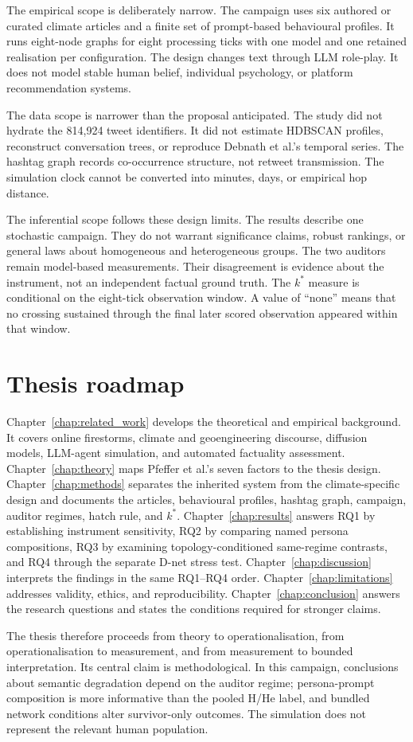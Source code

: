 The empirical scope is deliberately narrow.
The campaign uses six authored or curated climate articles and a finite set of prompt-based behavioural profiles.
It runs eight-node graphs for eight processing ticks with one model and one
retained realisation per configuration.
The design changes text through LLM role-play.
It does not model stable human belief, individual psychology, or platform recommendation systems.

The data scope is narrower than the proposal anticipated.
The study did not hydrate the 814,924 tweet identifiers.
It did not estimate HDBSCAN profiles, reconstruct conversation trees, or reproduce Debnath et al.'s temporal series.
The hashtag graph records co-occurrence structure, not retweet transmission.
The simulation clock cannot be converted into minutes, days, or empirical hop distance.

The inferential scope follows these design limits.
The results describe one stochastic campaign.
They do not warrant significance claims, robust rankings, or general laws about homogeneous and heterogeneous groups.
The two auditors remain model-based measurements.
Their disagreement is evidence about the instrument, not an independent factual ground truth.
The \(k^{*}\) measure is conditional on the eight-tick observation window.
A value of ``none'' means that no crossing sustained through the final later
scored observation appeared within that window.

\section{Thesis roadmap}
\label{sec:introduction_roadmap}

Chapter~\ref{chap:related_work} develops the theoretical and empirical background.
It covers online firestorms, climate and geoengineering discourse, diffusion models, LLM-agent simulation, and automated factuality assessment.
Chapter~\ref{chap:theory} maps Pfeffer et al.'s seven factors to the thesis design.
Chapter~\ref{chap:methods} separates the inherited system from the
climate-specific design and documents the articles, behavioural profiles,
hashtag graph, campaign, auditor regimes, hatch rule, and \(k^{*}\).
Chapter~\ref{chap:results} answers RQ1 by establishing instrument sensitivity,
RQ2 by comparing named persona compositions, RQ3 by examining
topology-conditioned same-regime contrasts, and RQ4 through the separate
D-net stress test.
Chapter~\ref{chap:discussion} interprets the findings in the same RQ1--RQ4 order.
Chapter~\ref{chap:limitations} addresses validity, ethics, and reproducibility.
Chapter~\ref{chap:conclusion} answers the research questions and states the conditions required for stronger claims.

The thesis therefore proceeds from theory to operationalisation, from operationalisation to measurement, and from measurement to bounded interpretation.
Its central claim is methodological.
In this campaign, conclusions about semantic degradation depend on the
auditor regime; persona-prompt composition is more informative than the pooled
H/He label, and bundled network conditions alter survivor-only outcomes. The
simulation does not represent the relevant human population.
